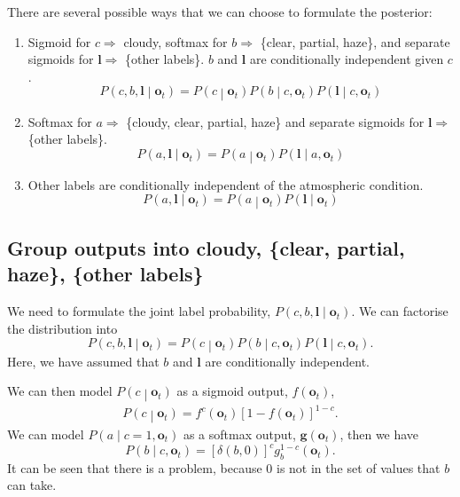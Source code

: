 \documentclass[11pt,a4paper]{article}
\begin{document}
There are several possible ways that we can choose to formulate the posterior:
\begin{enumerate}
\item Sigmoid for $c\Rightarrow$ cloudy, softmax for $b\Rightarrow$ \{clear, partial, haze\}, and separate sigmoids for $\bm{l}\Rightarrow$ \{other labels\}. $b$ and $\bm{l}$ are conditionally independent given $c$.
\[
P\left(c,b,\bm{l}\middle|\bm{o}_t\right)=P\left(c\middle|\bm{o}_t\right)P\left(b\middle|c,\bm{o}_t\right)P\left(\bm{l}\middle|c,\bm{o}_t\right)
\]
\item Softmax for $a\Rightarrow$ \{cloudy, clear, partial, haze\} and separate sigmoids for $\bm{l}\Rightarrow$ \{other labels\}.
\[
P\left(a,\bm{l}\middle|\bm{o}_t\right)=P\left(a\middle|\bm{o}_t\right)P\left(\bm{l}\middle|a,\bm{o}_t\right)
\]
\item Other labels are conditionally independent of the atmospheric condition.
\[
P\left(a,\bm{l}\middle|\bm{o}_t\right)=P\left(a\middle|\bm{o}_t\right)P\left(\bm{l}\middle|\bm{o}_t\right)
\]
\end{enumerate}

\subsection{Group outputs into cloudy, \{clear, partial, haze\}, \{other labels\}}

We need to formulate the joint label probability, $P\left(c,b,\bm{l}\middle|\bm{o}_t\right)$. We can factorise the distribution into
\[
P\left(c,b,\bm{l}\middle|\bm{o}_t\right)=P\left(c\middle|\bm{o}_t\right)P\left(b\middle|c,\bm{o}_t\right)P\left(\bm{l}\middle|c,\bm{o}_t\right).
\]
Here, we have assumed that $b$ and $\bm{l}$ are conditionally independent.

We can then model $P\left(c\middle|\bm{o}_t\right)$ as a sigmoid output, $f\left(\bm{o}_t\right)$,
\begin{align*}
P\left(c\middle|\bm{o}_t\right)=f^c\left(\bm{o}_t\right)\left[1-f\left(\bm{o}_t\right)\right]^{1-c}.
\end{align*}
We can model $P\left(a\middle|c=1,\bm{o}_t\right)$ as a softmax output, $\bm{g}\left(\bm{o}_t\right)$, then we have
\[
P\left(b\middle|c,\bm{o}_t\right)=\left[\delta\left(b,0\right)\right]^cg_b^{1-c}\left(\bm{o}_t\right).
\]
It can be seen that there is a problem, because $0$ is not in the set of values that $b$ can take.
\end{document}

